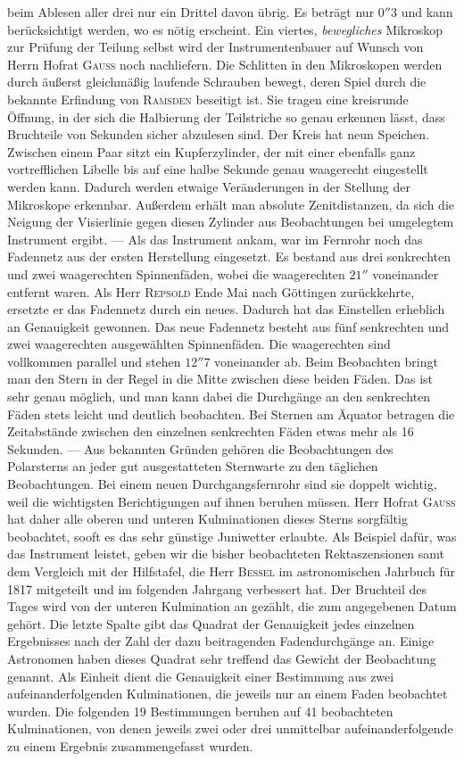 beim Ablesen aller drei nur ein Drittel davon übrig. Es beträgt nur $0''3$ und kann berücksichtigt werden, wo es nötig erscheint. Ein viertes, \emph{bewegliches} Mikroskop zur Prüfung der Teilung selbst wird der Instrumentenbauer auf Wunsch von Herrn Hofrat \textsc{Gauss} noch nachliefern. Die Schlitten in den Mikroskopen werden durch äußerst gleichmäßig laufende Schrauben bewegt, deren Spiel durch die bekannte Erfindung von \textsc{Ramsden} beseitigt ist. Sie tragen eine kreisrunde Öffnung, in der sich die Halbierung der Teilstriche so genau erkennen lässt, dass Bruchteile von Sekunden sicher abzulesen sind. Der Kreis hat neun Speichen. Zwischen einem Paar sitzt ein Kupferzylinder, der mit einer ebenfalls ganz vortrefflichen Libelle bis auf eine halbe Sekunde genau waagerecht eingestellt werden kann. Dadurch werden etwaige Veränderungen in der Stellung der Mikroskope erkennbar. Außerdem erhält man absolute Zenitdistanzen, da sich die Neigung der Visierlinie gegen diesen Zylinder aus Beobachtungen bei umgelegtem Instrument ergibt. --- Als das Instrument ankam, war im Fernrohr noch das Fadennetz aus der ersten Herstellung eingesetzt. Es bestand aus drei senkrechten und zwei waagerechten Spinnenfäden, wobei die waagerechten $21''$ voneinander entfernt waren. Als Herr \textsc{Repsold} Ende Mai nach Göttingen zurückkehrte, ersetzte er das Fadennetz durch ein neues. Dadurch hat das Einstellen erheblich an Genauigkeit gewonnen. Das neue Fadennetz besteht aus fünf senkrechten und zwei waagerechten ausgewählten Spinnenfäden. Die waagerechten sind vollkommen parallel und stehen $12''7$ voneinander ab. Beim Beobachten bringt man den Stern in der Regel in die Mitte zwischen diese beiden Fäden. Das ist sehr genau möglich, und man kann dabei die Durchgänge an den senkrechten Fäden stets leicht und deutlich beobachten. Bei Sternen am Äquator betragen die Zeitabstände zwischen den einzelnen senkrechten Fäden etwas mehr als 16 Sekunden. --- Aus bekannten Gründen gehören die Beobachtungen des Polarsterns an jeder gut ausgestatteten  Sternwarte zu den täglichen Beobachtungen. Bei einem neuen Durchgangsfernrohr sind sie doppelt wichtig, weil die wichtigsten Berichtigungen auf ihnen beruhen müssen. Herr Hofrat \textsc{Gauss} hat daher alle oberen und unteren Kulminationen dieses Sterns sorgfältig beobachtet, sooft es das sehr günstige Juniwetter erlaubte. Als Beispiel dafür, was das Instrument leistet, geben wir die bisher beobachteten Rektaszensionen samt dem Vergleich mit der Hilfstafel, die Herr \textsc{Bessel} im astronomischen Jahrbuch für 1817 mitgeteilt und im folgenden Jahrgang verbessert hat. Der Bruchteil des Tages wird von der unteren Kulmination an gezählt, die zum angegebenen Datum gehört. Die letzte Spalte gibt das Quadrat der Genauigkeit jedes einzelnen Ergebnisses nach der Zahl der dazu beitragenden Fadendurchgänge an. Einige Astronomen haben dieses Quadrat sehr treffend das Gewicht der Beobachtung genannt. Als Einheit dient die Genauigkeit einer Bestimmung aus zwei aufeinanderfolgenden Kulminationen, die jeweils nur an einem Faden beobachtet wurden. Die folgenden 19 Bestimmungen beruhen auf 41 beobachteten Kulminationen, von denen jeweils zwei oder drei unmittelbar aufeinanderfolgende zu einem Ergebnis zusammengefasst wurden.

